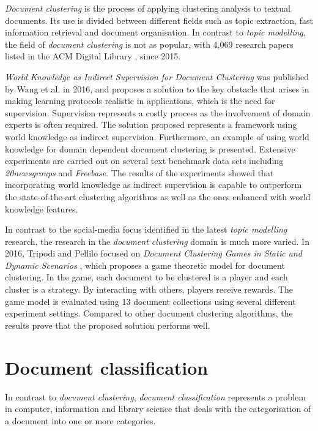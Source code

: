 \textit{Document clustering} is the process of applying clustering analysis to textual documents. Its use is divided between different fields such as topic extraction, fast information retrieval and document organisation. In contrast to \textit{topic modelling}, the field of \textit{document clustering} is not as popular, with 4,069 research papers listed in the ACM Digital Library \cite{acm_digital_library}, since 2015.

\textit{World Knowledge as Indirect Supervision for Document Clustering} \cite{wang2016world} was published by Wang et al. in 2016, and proposes a solution to the key obstacle that arises in making learning protocols realistic in applications, which is the need for supervision. Supervision represents a costly process as the involvement of domain experts is often required. The solution proposed represents a framework using world knowledge as indirect supervision. Furthermore, an example of using world knowledge for domain dependent document clustering is presented. Extensive experiments are carried out on several text benchmark data sets including \textit{20newsgroups} and \textit{Freebase}. The results of the experiments showed that incorporating world knowledge as indirect supervision is capable to outperform the state-of-the-art clustering algorithms as well as the ones enhanced with world knowledge features.

In contrast to the social-media focus identified in the latest \textit{topic modelling} research, the research in the \textit{document clustering} domain is much more varied. In 2016, Tripodi and Pellilo focused on \textit{Document Clustering Games in Static and Dynamic Scenarios} \cite{tripodi2016document}, which proposes a game theoretic model for document clustering. In the game, each document to be clustered is a player and each cluster is a strategy. By interacting with others, players receive rewards. The game model is evaluated using 13 document collections using several different experiment settings. Compared to other document clustering algorithms, the results prove that the proposed solution performs well.

\section{Document classification}

In contrast to \textit{document clustering}, \textit{document classification} represents a problem in computer, information and library science that deals with the categorisation of a document into one or more categories.

